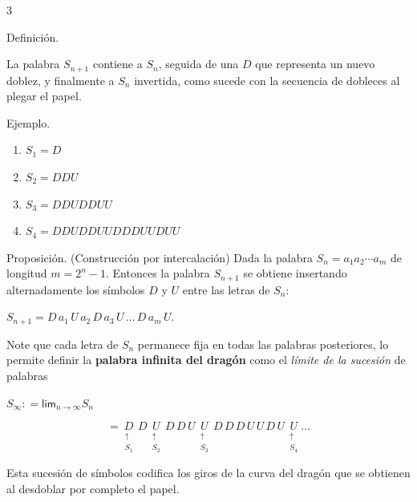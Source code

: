 \documentclass{sciposter}
\begin{document}
\begin{multicols*}{3}
\begin{defbox}{Definición.}
\end{defbox}
La palabra $S_{n+1}$ contiene a $S_n$, seguida de una $D$ que representa un nuevo doblez, y finalmente a $S_n$ invertida, como sucede con la secuencia de dobleces al plegar el papel.
\begin{defbox}{Ejemplo.}
\begin{enumerate}
    \item $S_1 = D$
    \item $S_2 = DDU$
    \item $S_3 = DDUDDUU$
    \item $S_4 = DDUDDUUDDDUUDUU$
\end{enumerate}
\end{defbox}
\begin{defbox}{Proposición. (Construcción por intercalación)}
Dada la palabra $S_n = a_1 a_2 \cdots a_m$ de longitud $m = 2^n - 1$. Entonces la palabra $S_{n+1}$ se obtiene insertando alternadamente los símbolos $D$ y $U$ entre las letras de $S_n$:
\begin{center}
$S_{n+1} = D\, a_1 \, U \, a_2 \, D \, a_3 \, U \, \dots \, D \, a_m \, U$.
\end{center}
\end{defbox}
Note que cada letra de $S_n$ permanece fija en todas las palabras posteriores, lo permite definir la \textbf{palabra infinita del dragón} como el \textit{límite de la sucesión} de palabras 
\begin{center}
$S_\infty : = \mathsf{lim}_{n \to \infty}S_n$
\end{center}
\[ = 
\underset{\substack{\uparrow\\[1pt]S_1}}{{D}} 
\, {D} \, 
\underset{\substack{\uparrow\\[1pt]S_2}}{{U}} 
\, {D} \, {D} \, {U} \, 
\underset{\substack{\uparrow\\[1pt]S_3}}{{U}} 
\, {D} \, {D} \, {D} \, {U} \, {U} \, {D} \, {U} \, 
\underset{\substack{\uparrow\\[1pt]S_4}}{U}\dots
\]

Esta sucesión de símbolos codifica los giros de la curva del dragón que se obtienen al desdoblar por completo el papel.

\vspace{-1cm}

\end{multicols*}
\end{document}
